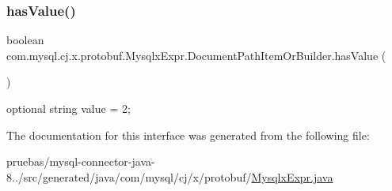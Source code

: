 \subsubsection{\texorpdfstring{has\+Value()}{hasValue()}}
{\footnotesize\ttfamily boolean com.\+mysql.\+cj.\+x.\+protobuf.\+Mysqlx\+Expr.\+Document\+Path\+Item\+Or\+Builder.\+has\+Value (\begin{DoxyParamCaption}{ }\end{DoxyParamCaption})}

{\ttfamily optional string value = 2;} 

The documentation for this interface was generated from the following file\+:\begin{DoxyCompactItemize}
\item 
pruebas/mysql-\/connector-\/java-\/8../src/generated/java/com/mysql/cj/x/protobuf/\mbox{\hyperlink{_mysqlx_expr_8java}{Mysqlx\+Expr.\+java}}\end{DoxyCompactItemize}
